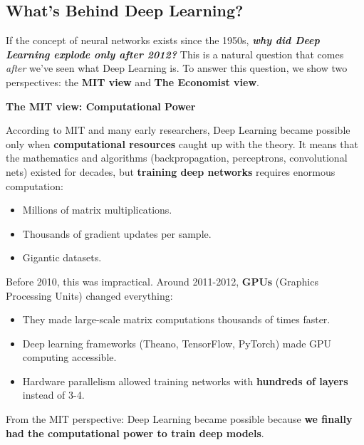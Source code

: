 \subsection{What's Behind Deep Learning?}\label{sec:whats-behind-deep-learning}

If the concept of neural networks exists since the 1950s, \textbf{\emph{why did Deep Learning explode only after 2012?}} This is a natural question that comes \emph{after} we've seen what Deep Learning is. To answer this question, we show two perspectives: the \textbf{MIT view} and \textbf{The Economist view}.

\highspace
\begin{flushleft}
    \textcolor{Green3}{ \textbf{The MIT view: Computational Power}}\label{mit-view}
\end{flushleft}
According to MIT and many early researchers, Deep Learning became possible only when \textbf{computational resources} caught up with the theory. It means that the mathematics and algorithms (backpropagation, perceptrons, convolutional nets) existed for decades, but \textbf{training deep networks} requires enormous computation:
\begin{itemize}
    \item Millions of matrix multiplications.
    \item Thousands of gradient updates per sample.
    \item Gigantic datasets.
\end{itemize}
Before 2010, this was impractical. Around 2011-2012, \textbf{GPUs} (Graphics Processing Units) changed everything:
\begin{itemize}
    \item They made large-scale matrix computations thousands of times faster.
    \item Deep learning frameworks (Theano, TensorFlow, PyTorch) made GPU computing accessible.
    \item Hardware parallelism allowed training networks with \textbf{hundreds of layers} instead of 3-4.
\end{itemize}
From the MIT perspective: Deep Learning became possible because \textbf{we finally had the computational power to train deep models}.


